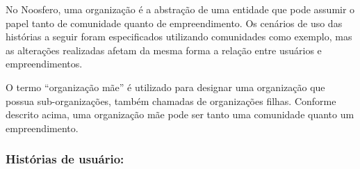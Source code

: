 No Noosfero, uma organização é a abstração de uma entidade que pode assumir
o papel tanto de comunidade quanto de empreendimento. Os cenários de uso das
histórias a seguir foram especificados utilizando comunidades como exemplo,
mas as alterações realizadas afetam da mesma forma a relação entre usuários
e empreendimentos.


O termo ``organização mãe'' é utilizado para designar uma organização que
possua sub-organizações, também chamadas de organizações filhas. Conforme
descrito acima, uma organização mãe pode ser tanto uma comunidade quanto um
empreendimento.

\subsubsection*{Histórias de usuário:}

